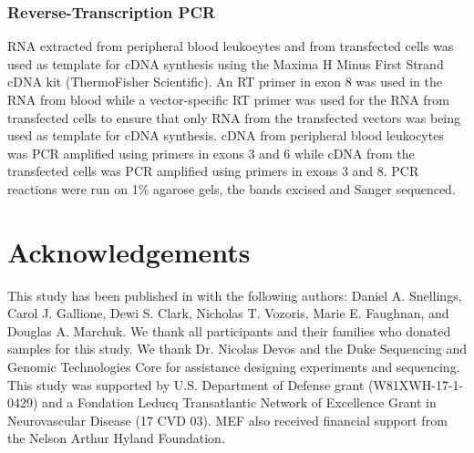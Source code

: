 \subsubsection{Reverse-Transcription PCR}
RNA extracted from peripheral blood leukocytes and from transfected cells was used as template for cDNA synthesis using the Maxima H Minus First Strand cDNA kit (ThermoFisher Scientific).  An RT primer in  exon 8 was used in the RNA from blood while a vector-specific RT primer was used for the RNA from transfected cells to ensure that only RNA from the transfected vectors was being used as template for cDNA synthesis. cDNA from peripheral blood leukocytes was PCR amplified using primers in exons 3 and 6 while cDNA from the transfected cells was PCR amplified using primers in exons 3 and 8.  PCR reactions were run on 1\% agarose gels, the bands excised and Sanger sequenced. 

\section{Acknowledgements}
This study has been published in  \citep{snellings2019} with the following authors: Daniel A. Snellings, Carol J. Gallione, Dewi S. Clark, Nicholas T. Vozoris, Marie E. Faughnan, and Douglas A. Marchuk. We thank all participants and their families who donated samples for this study. We thank Dr. Nicolas Devos and the Duke Sequencing and Genomic Technologies Core for assistance designing experiments and sequencing. This study was supported by U.S. Department of Defense grant (W81XWH-17-1-0429) and a Fondation Leducq Transatlantic Network of Excellence Grant in Neurovascular Disease (17 CVD 03). MEF also received financial support from the Nelson Arthur Hyland Foundation. 